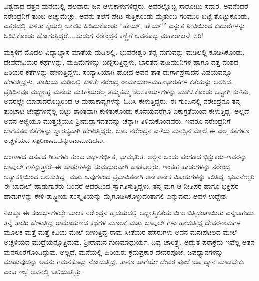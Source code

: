 ವಿಶ್ವನಾಥ ದತ್ತನ ಮನೆಯಲ್ಲಿ ಹಲವಾರು ಜನ ಆಳುಕಾಳುಗಳಿದ್ದರು. ಅವರಲ್ಲೊಬ್ಬ ಸಾರೋಟು ಸವಾರ. ಅವನೆಂದರೆ ನರೇಂದ್ರನಿಗೆ ತುಂಬ ಅಚ್ಚುಮೆಚ್ಚು. ಅವನು ತಲೆಗೆ ಪೇಟ ಸುತ್ತಿಕೊಂಡು ಮೈತುಂಬ ಗರಿಮುರಿ ಬಟ್ಟೆ ತೊಟ್ಟುಕೊಂಡು, ಎತ್ತರದಲ್ಲಿ ಕುಳಿತು ಕೈಯಲ್ಲಿ ಚಾವಟಿ ಹಿಡಿದುಕೊಂಡು “ಹೇಯ್, ಹೇಯ್!” ಎನ್ನುತ್ತ ಠೀವಿಯಿಂದ ಕುದುರೆಗಳನ್ನು ಓಡಿಸಿಕೊಂಡು ಹೋಗುತ್ತಿದ್ದರೆ....ಹುಡುಗ ನರೇಂದ್ರನ ಕಣ್ಣಿಗೆ ಅವನೊಬ್ಬ ಮಹಾರಾಜನೇ ಸರಿ!

ಮಕ್ಕಳಿಗೆ ಮೊದಲ ವಿದ್ಯಾಭ್ಯಾಸ ಮಾತೆಯ ಮಡಿಲಲ್ಲಿ. ಭುವನೇಶ್ವರಿ ತನ್ನ ಮಗುವನ್ನು ಮಡಿಲಲ್ಲಿ ಕೂಡಿಸಿಕೊಂಡು, ದೇವದೇವಿಯರ ಕಥೆಗಳನ್ನು, ಮಹಿಮೆಗಳನ್ನು ಬಣ್ಣಿಸುತ್ತಿದ್ದಳು, ಭಾರತದ ಪುಷಿಮುನಿಗಳ ಹಾಗೂ ದತ್ತ ವಂಶದ ಹಿರಿಯರ ಕತೆಗಳನ್ನು ಹೇಳುತ್ತಿದ್ದಳು. ಸಂನ್ಯಾಸಿಯಾಗಿ ಹೋದ ಅವನ ತಾತ ದುರ್ಗಾಪ್ರಸಾದನ ವಿಷಯವನ್ನೂ ಹೇಳುತ್ತಿದ್ದಳು. ತಾಯಿಯ ಮಡಿಲಲ್ಲಿ ಕುಳಿತೇ ನರೇಂದ್ರ ರಾಮಾಯಣ-ಮಹಾಭಾರತಗಳ ಕತೆಯನ್ನು ಆಲಿಸಿದ. ಪ್ರತಿದಿನವೂ ಮಧ್ಯಾಹ್ನ ಮನೆಯ ಮಹಿಳೆಯರೆಲ್ಲ ತಮ್ಮತಮ್ಮ ಕೆಲಸಕಾರ್ಯಗಳನ್ನು ಮುಗಿಸಿಕೊಂಡು ಒಟ್ಟಾಗಿ ಕುಳಿತು, ಅವರಲ್ಲೇ ಯಾರಾದರೊಬ್ಬರಿಂದ ಆ ಮಹಾಕಾವ್ಯಗಳನ್ನು ಓದಿಸಿ ಕೇಳುತ್ತಿದ್ದರು. ಈ ಗುಂಪಿನಲ್ಲಿ ನರೇಂದ್ರನೂ ತನ್ನ ತುಂಟಾಟ ಚೇಷ್ಟೆಗಳನ್ನೆಲ್ಲ ಬಿಟ್ಟು ಶಾಂತವಾಗಿ ಕುಳಿತುಕೊಂಡು ಕೊನೆಯವರೆಗೂ ಏಕಾಗ್ರತೆಯಿಂದ ಕೇಳುತ್ತಿದ್ದ. ಅಲ್ಲದೆ ಅವನ ಅಜ್ಜಿಯೂ ಮುತ್ತಜ್ಜಿಯೂ ಶ್ರೀಮದ್ಭಾಗವತವನ್ನು ಚೆನ್ನಾಗಿ ತಿಳಿದುಕೊಂಡವರು. ಇವರೂ ನರೇಂದ್ರನಿಗೆ ಭಾಗವತದ ಕತೆಗಳನ್ನು ಸ್ವಾರಸ್ಯವಾಗಿ ಹೇಳುತ್ತಿದ್ದರು. ಬಾಲ ನರೇಂದ್ರನ ಎಳೆಯ ಮನಸ್ಸಿನ ಮೇಲೆ ಈ ಎಲ್ಲ ಕತೆಗಳೂ ಅಚ್ಚಳಿಯದ ಸತ್ಪರಿಣಾಮವನ್ನುಂಟುಮಾಡಿದವು.

ಬಂಗಾಳದ ಜನಪದ ಗೀತೆಗಳು ತುಂಬ ಅರ್ಥಗರ್ಭಿತ, ಭಾವಭರಿತ. ಅಲ್ಲಿನ ಒಂದು ಪಂಗಡದ ಭಿಕ್ಷುಕರು–ಇವರನ್ನು ಬಾವುಲ್ ಗಳೆನ್ನುತ್ತಾರೆ–ಈ ಹಾಡುಗಳನ್ನು ಸುಮಧುರವಾಗಿ ಹಾಡಬಲ್ಲರು. ಇಂತಹ ಹಾಡುಗಳನ್ನು ನರೇಂದ್ರ ಅತ್ಯಾಸಕ್ತಿಯಿಂದ ಆಲಿಸುತ್ತಿದ್ದ. ಮತ್ತು ಅವುಗಳಿಂದ ಪ್ರಭಾವಿತನಾಗಿ ಅನೇಕಾನೇಕ ವಿಷಯಗಳನ್ನು ಕಲಿತಿದ್ದ. ಭುವನೇಶ್ವರಿ ಈ ಬಾವುಲ್ ಹಾಡುಗಾರರು ಬಂದರೆ ಆದರದಿಂದ ಸ್ವಾಗತಿಸುತ್ತಿದ್ದಳು. ತನ್ನ ಮಗ ಆ ನೀತಿಪರ ಹಾಗೂ ಭಕ್ತಿಪರ ಹಾಡುಗಳನ್ನು ಕೇಳಿ ರಾಷ್ಟ್ರೀಯ ಸಂಸ್ಕೃತಿಯನ್ನು ಮೈಗೂಡಿಸಿಕೊಳ್ಳುವಂತಾಗಲಿ ಎನ್ನುವುದು ಅವಳ ಉದ್ದೇಶ.

ನಿಜಕ್ಕೂ ಈ ಸಂದರ್ಭಗಳಲ್ಲೇ ಬಾಲಕ ನರೇಂದ್ರನ ಹೃದಯದಲ್ಲಿ ಆಧ್ಯಾತ್ಮಿಕತೆಯ ಬೀಜ ಬಿತ್ತಿದಂತಾಯಿತು ಎನ್ನಬಹುದು. ತನ್ನ ತಾಯಿ ಹೇಳುತ್ತಿದ್ದ ರಾಮಾಯಣದ ಕಥೆಗಳ ಮೂಲಕ ಮತ್ತು ಬಾವುಲ್ ಗಳು ಹಾಡುತ್ತಿದ್ದ ದೇವರನಾಮಗಳ ಮೂಲಕ ಮತ್ತೆ ಮತ್ತೆ ಕಿವಿಯ ಮೇಲೆ ಬೀಳುತ್ತಿದ್ದ ರಾಮ-ಸೀತೆಯರ ಹೆಸರುಗಳು ಅವನ ಮನಃಪಟಲದ ಮೇಲೆ ಅಚ್ಚಳಿಯದ ಮುದ್ರೆಯನ್ನೊತ್ತಿದುವು. ಶ್ರೀರಾಮನ ಗುಣಮಾಧುರ್ಯ, ದಿವ್ಯ ಚಾರಿತ್ರ್ಯ, ಅದ್ಭುತ ಪರಾಕ್ರಮ ಇವೆಲ್ಲ ಆತನ ಮನಸೂರೆಗೊಂಡಿದ್ದುವು. ಅಲ್ಲದೆ, ಮನೆಯಲ್ಲಿ ಹಿರಿಯರು ಕ್ರಮಪ್ರಕಾರ ದೇವರಪೂಜೆ, ಜಪಧ್ಯಾನಗಳನ್ನು ಮಾಡುವುದನ್ನು ಅವನು ಗಮನಕೊಟ್ಟು ನೋಡುತ್ತಿದ್ದ. ತಾನೂ ಹಾಗೆಯೇ ದೇವರ ಪೂಜೆ ಜಪ ಧ್ಯಾನ ಮಾಡಬೇಕು ಎಂಬ ಇಚ್ಛೆ ಅವನಲ್ಲಿ ಬಲಿಯುತ್ತಿತ್ತು.

